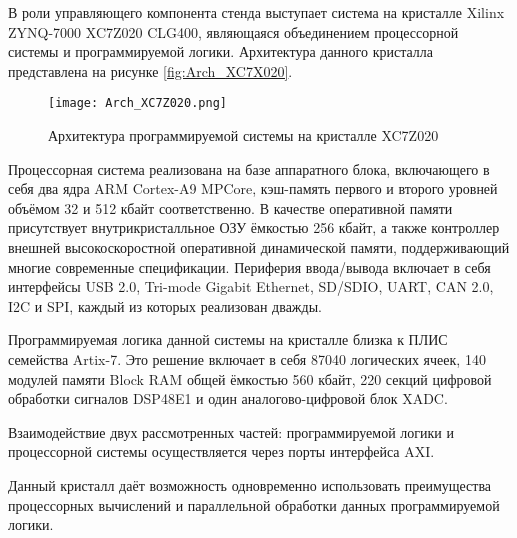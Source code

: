 В роли управляющего компонента стенда выступает система на кристалле Xilinx ZYNQ-7000 XC7Z020 CLG400, являющаяся объединением процессорной системы и программируемой логики. Архитектура данного кристалла представлена на рисунке \ref{fig:Arch_XC7X020}.\par
\begin{figure}[ht]
    \centering
    \texttt{[image: Arch\_XC7Z020.png]}
    \caption{Архитектура программируемой системы на кристалле XC7Z020}
    \label{fig:Arch_XC7Z020}
\end{figure}
Процессорная система реализована на базе аппаратного блока, включающего в себя два ядра ARM Cortex-A9 MPCore, кэш-память первого и второго уровней объёмом 32 и 512 кбайт соответственно. В качестве оперативной памяти присутствует внутрикристалльное ОЗУ ёмкостью 256 кбайт, а также контроллер внешней высокоскоростной оперативной динамической памяти, поддерживающий многие современные спецификации. Периферия ввода/вывода включает в себя интерфейсы USB 2.0, Tri-mode Gigabit Ethernet, SD/SDIO, UART, CAN 2.0, I2C и SPI, каждый из которых реализован дважды.\par
Программируемая логика данной системы на кристалле близка к ПЛИС семейства Artix-7. Это решение включает в себя 87040 логических ячеек, 140 модулей памяти Block RAM общей ёмкостью 560 кбайт, 220 секций цифровой обработки сигналов DSP48E1 и один аналогово-цифровой блок XADC.\par
Взаимодействие двух рассмотренных частей: программируемой логики и процессорной системы осуществляется через порты интерфейса AXI.\par
Данный кристалл даёт возможность одновременно использовать преимущества процессорных вычислений и параллельной обработки данных программируемой логики.
